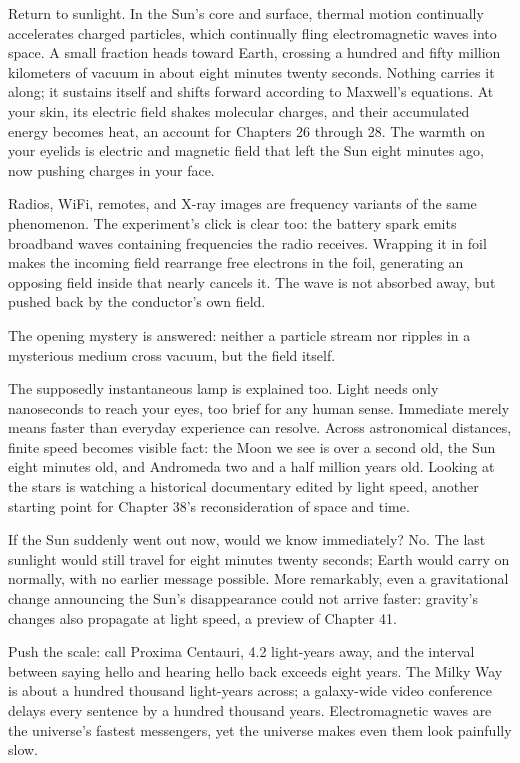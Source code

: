 \begin{mainline}
Return to sunlight. In the Sun's core and surface, thermal motion continually accelerates charged particles, which continually fling electromagnetic waves into space. A small fraction heads toward Earth, crossing a hundred and fifty million kilometers of vacuum in about eight minutes twenty seconds. Nothing carries it along; it sustains itself and shifts forward according to Maxwell's equations. At your skin, its electric field shakes molecular charges, and their accumulated energy becomes heat, an account for Chapters 26 through 28. The warmth on your eyelids is electric and magnetic field that left the Sun eight minutes ago, now pushing charges in your face.

Radios, WiFi, remotes, and X-ray images are frequency variants of the same phenomenon. The experiment's click is clear too: the battery spark emits broadband waves containing frequencies the radio receives. Wrapping it in foil makes the incoming field rearrange free electrons in the foil, generating an opposing field inside that nearly cancels it. The wave is not absorbed away, but pushed back by the conductor's own field.

The opening mystery is answered: neither a particle stream nor ripples in a mysterious medium cross vacuum, but the field itself.

The supposedly instantaneous lamp is explained too. Light needs only nanoseconds to reach your eyes, too brief for any human sense. Immediate merely means faster than everyday experience can resolve. Across astronomical distances, finite speed becomes visible fact: the Moon we see is over a second old, the Sun eight minutes old, and Andromeda two and a half million years old. Looking at the stars is watching a historical documentary edited by light speed, another starting point for Chapter 38's reconsideration of space and time.
\end{mainline}


\begin{thought}
If the Sun suddenly went out now, would we know immediately? No. The last sunlight would still travel for eight minutes twenty seconds; Earth would carry on normally, with no earlier message possible. More remarkably, even a gravitational change announcing the Sun's disappearance could not arrive faster: gravity's changes also propagate at light speed, a preview of Chapter 41.

Push the scale: call Proxima Centauri, 4.2 light-years away, and the interval between saying hello and hearing hello back exceeds eight years. The Milky Way is about a hundred thousand light-years across; a galaxy-wide video conference delays every sentence by a hundred thousand years. Electromagnetic waves are the universe's fastest messengers, yet the universe makes even them look painfully slow.
\end{thought}

